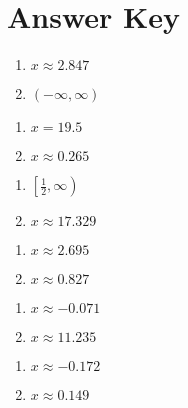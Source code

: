 \newpage

\section{Answer Key}

\begin{multicols}{2}
\begin{enumerate}
	\item $x \approx 2.847$
	\item $(-\infty, \infty)$
\end{enumerate} \setcounter{Review}{\value{enumi}}
\end{multicols}
\begin{multicols}{2}
\begin{enumerate}	\setcounter{enumi}{\value{Review}}
	\item $x = 19.5$
	\item $x \approx 0.265$
\end{enumerate} \setcounter{Review}{\value{enumi}}
\end{multicols}
\begin{multicols}{2}
\begin{enumerate}	\setcounter{enumi}{\value{Review}}
	\item $\left[\frac{1}{2}, \infty\right)$
	\item $x \approx 17.329$
\end{enumerate} \setcounter{Review}{\value{enumi}}
\end{multicols}
\begin{multicols}{2}
\begin{enumerate}	\setcounter{enumi}{\value{Review}}
	\item $x \approx 2.695$
    \item $x \approx 0.827$
\end{enumerate} \setcounter{Review}{\value{enumi}}
\end{multicols}
\begin{multicols}{2}
\begin{enumerate}	\setcounter{enumi}{\value{Review}}
    \item $x \approx -0.071$
    \item $x \approx 11.235$
\end{enumerate} \setcounter{Review}{\value{enumi}}
\end{multicols}
\begin{multicols}{2}
\begin{enumerate}	\setcounter{enumi}{\value{Review}}
    \item $x \approx -0.172$
    \item $x \approx 0.149$
\end{enumerate} \setcounter{Review}{\value{enumi}}
\end{multicols}
